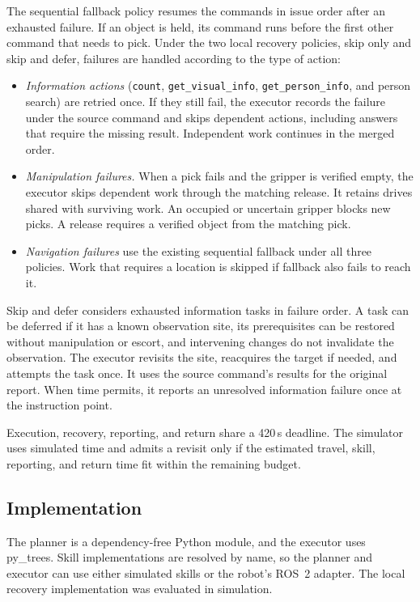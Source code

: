 \documentclass[conference]{IEEEtran}
\newcommand{\todo}[1]{}
\newcommand{\todo}[1]{\textcolor{red}{[TODO: #1]}}
\newcommand{\code}[1]{\texttt{#1}}
\begin{document}
The sequential fallback policy resumes the commands in issue order after
an exhausted failure. If an object is held, its command runs before the
first other command that needs to pick. Under the two local recovery policies,
skip only and skip and defer, failures are handled according to the type of
action:
\begin{itemize}
  \item \emph{Information actions} (\code{count}, \code{get\_visual\_info},
    \code{get\_person\_info}, and person search) are retried once. If they
    still fail, the executor records the failure under the source command
    and skips dependent actions, including answers that require the
    missing result. Independent work continues in the merged order.
  \item \emph{Manipulation failures.} When a pick fails and the gripper
    is verified empty, the executor skips dependent work through the
    matching release. It retains drives shared with surviving work.
    An occupied or uncertain gripper blocks new picks. A release requires
    a verified object from the matching pick.
  \item \emph{Navigation failures} use the existing sequential fallback
    under all three policies. Work that requires a location is skipped if
    fallback also fails to reach it.
\end{itemize}

Skip and defer considers exhausted information tasks in failure order.
A task can be deferred if it has a known observation site, its prerequisites
can be restored without manipulation or escort, and intervening changes
do not invalidate the observation. The executor revisits the site,
reacquires the target if needed, and attempts the task once. It uses the
source command's results for the original report. When time permits, it
reports an unresolved information failure once at the instruction point.

Execution, recovery, reporting, and return share a 420\,s deadline. The
simulator uses simulated time and admits a revisit only if the estimated
travel, skill, reporting, and return time fit within the remaining budget.

\subsection{Implementation}
The planner is a dependency-free Python module, and the executor uses
py\_trees. Skill implementations are resolved by name, so the planner and
executor can use either simulated skills or the robot's ROS~2 adapter.
The local recovery implementation was evaluated in simulation.
\todo{Port local recovery to the robot. Add the platform description and figure.}
\end{document}
